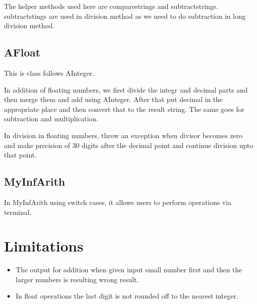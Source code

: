 \documentclass{article}
\begin{document}
The helper methods used here are comparestrings and subtractstrings. subtractstings are used in division method as we need to do subtraction in long division method.

\subsection{AFloat}
This is class follows AInteger.

In addition of floating numbers, we first divide the integr and decimal parts and then merge them and add using AInteger. After that put decimal in the appropriate place and then convert that to the result string. The same goes for subtraction and multiplication.

In division in floating numbers, throw an exception when divisor becomes zero and make precision of 30 digits after the decimal point and continue division upto that point.

\subsection{MyInfArith}
In MyInfArith using switch cases, it allows users to perform operations via terminal.

\section{Limitations}
\begin{itemize}
\item The output for addition when given input small number first and then the larger numbers is resulting wrong result.
\item In float operations the last digit is not rounded off to the nearest integer.
\end{itemize}
\end{document}
